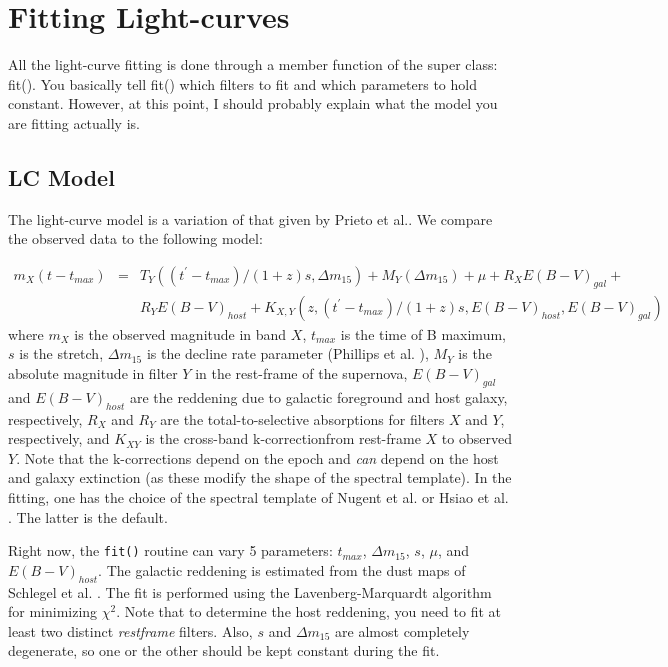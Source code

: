 \documentclass[12pt]{article}
\begin{document}
\section{Fitting Light-curves}

All the light-curve fitting is done through a member function of the
super class: fit(). You basically tell fit() which filters to fit
and which parameters to hold constant. However, at this point, I should
probably explain what the model you are fitting actually is.


\subsection{LC Model}

The light-curve model is a variation of that given by Prieto et al.\cite{Prieto2006}.
We compare the observed data to the following model:

\begin{eqnarray*}
m_{X}\left(t-t_{max}\right) & = & T_{Y}\left(\left(t^{\prime}-t_{max}\right)/(1+z)s,\Delta m_{15}\right)+M_{Y}\left(\Delta m_{15}\right)+\mu+R_{X}E\left(B-V\right)_{gal}+\\
 &  & R_{Y}E\left(B-V\right)_{host}+K_{X,Y}\left(z,\left(t^{\prime}-t_{max}\right)/(1+z)s,E\left(B-V\right)_{host},E\left(B-V\right)_{gal}\right)\end{eqnarray*}
where $m_{X}$ is the observed magnitude in band $X$, $t_{max}$
is the time of B maximum, $s$ is the stretch, $\Delta m_{15}$ is
the decline rate parameter (Phillips et al. \cite{Phillips1993}),
$M_{Y}$ is the absolute magnitude in filter $Y$ in the rest-frame
of the supernova, $E(B-V)_{gal}$ and $E(B-V)_{host}$ are the reddening
due to galactic foreground and host galaxy, respectively, $R_{X}$
and $R_{Y}$ are the total-to-selective absorptions for filters $X$
and $Y$, respectively, and $K_{XY}$ is the cross-band k-correction$ $from
rest-frame $X$ to observed $Y$. Note that the k-corrections depend
on the epoch and \emph{can} depend on the host and galaxy extinction
(as these modify the shape of the spectral template). In the fitting,
one has the choice of the spectral template of Nugent et al. \cite{Nugent2002}
or Hsiao et al. \cite{Hsiao2007}. The latter is the default.

Right now, the \texttt{fit()} routine can vary 5 parameters: $t_{max}$,
$\Delta m_{15}$, $s$, $\mu$, and $E(B-V)_{host}$. The galactic
reddening is estimated from the dust maps of Schlegel et al. \cite{Schlegel1998}.
The fit is performed using the Lavenberg-Marquardt algorithm for minimizing
$\chi^{2}$. Note that to determine the host reddening, you need to
fit at least two distinct \emph{restframe} filters. Also, $s$ and
$\Delta m_{15}$ are almost completely degenerate, so one or the other
should be kept constant during the fit.
\end{document}
